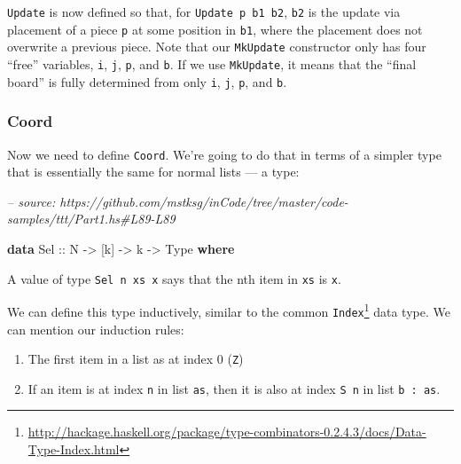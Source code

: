 \documentclass[]{article}
\newenvironment{Shaded}{}{}
\newcommand{\CommentTok}[1]{\textcolor[rgb]{0.38,0.63,0.69}{\textit{#1}}}
\newcommand{\DataTypeTok}[1]{\textcolor[rgb]{0.56,0.13,0.00}{#1}}
\newcommand{\KeywordTok}[1]{\textcolor[rgb]{0.00,0.44,0.13}{\textbf{#1}}}
\newcommand{\NormalTok}[1]{#1}
\newcommand{\OtherTok}[1]{\textcolor[rgb]{0.00,0.44,0.13}{#1}}
\renewcommand{\href}[2]{#2\footnote{\url{#1}}}
\begin{document}
\texttt{Update} is now defined so that, for \texttt{Update\ p\ b1\ b2},
\texttt{b2} is the update via placement of a piece \texttt{p} at some position
in \texttt{b1}, where the placement does not overwrite a previous piece. Note
that our \texttt{MkUpdate} constructor only has four ``free'' variables,
\texttt{i}, \texttt{j}, \texttt{p}, and \texttt{b}. If we use \texttt{MkUpdate},
it means that the ``final board'' is fully determined from only \texttt{i},
\texttt{j}, \texttt{p}, and \texttt{b}.

\hypertarget{coord}{%
\subsubsection{Coord}\label{coord}}

Now we need to define \texttt{Coord}. We're going to do that in terms of a
simpler type that is essentially the same for normal lists --- a type:

\begin{Shaded}
\begin{Highlighting}[]
\CommentTok{-- source: https://github.com/mstksg/inCode/tree/master/code-samples/ttt/Part1.hs#L89-L89}

\KeywordTok{data} \DataTypeTok{Sel}\OtherTok{ ::} \DataTypeTok{N} \OtherTok{->}\NormalTok{ [k] }\OtherTok{->}\NormalTok{ k }\OtherTok{->} \DataTypeTok{Type} \KeywordTok{where}
\end{Highlighting}
\end{Shaded}

A value of type \texttt{Sel\ n\ xs\ x} says that the nth item in \texttt{xs} is
\texttt{x}.

We can define this type inductively, similar to the common
\href{http://hackage.haskell.org/package/type-combinators-0.2.4.3/docs/Data-Type-Index.html}{\texttt{Index}}
data type. We can mention our induction rules:

\begin{enumerate}
\def\labelenumi{\arabic{enumi}.}
\tightlist
\item
  The first item in a list as at index 0 (\texttt{Z})
\item
  If an item is at index \texttt{n} in list \texttt{as}, then it is also at
  index \texttt{S\ n} in list \texttt{b\ \textquotesingle{}:\ as}.
\end{enumerate}
\end{document}
